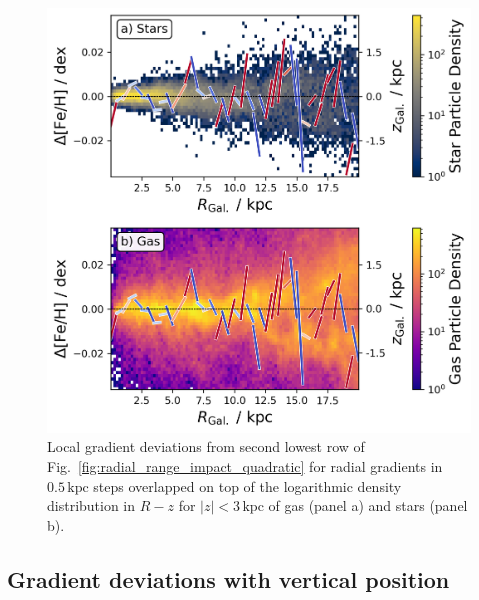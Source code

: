 \documentclass[fleqn,usenatbib]{mnras}
\begin{document}
\begin{figure}
    \centering
    \includegraphics[width=\columnwidth]{figures/overlap_local_variation_gas.png}
    \caption{Local gradient deviations from second lowest row of Fig.~\ref{fig:radial_range_impact_quadratic} for radial gradients in $0.5\,\mathrm{kpc}$ steps overlapped on top of the logarithmic density distribution in $R-z$ for $\vert z \vert < 3\,\mathrm{kpc}$ of gas (panel a) and stars (panel b).}
    \label{fig:overlap_local_variation_gas}
\end{figure}

\subsection{Gradient deviations with vertical position}
\label{sec:coherence_vertical_radial_metallicity_gradients}
\end{document}
